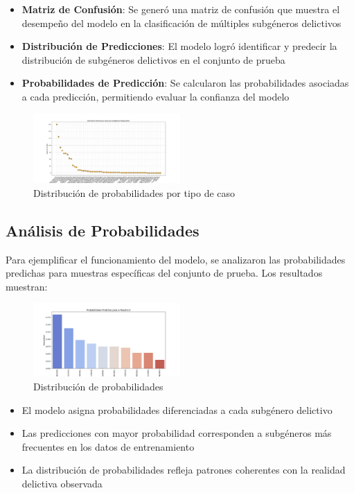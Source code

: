 \documentclass[conference]{IEEEtran}
\begin{document}
\begin{itemize}
\item \textbf{Matriz de Confusión}: Se generó una matriz de confusión que muestra el desempeño del modelo en la clasificación de múltiples subgéneros delictivos
\item \textbf{Distribución de Predicciones}: El modelo logró identificar y predecir la distribución de subgéneros delictivos en el conjunto de prueba
\item \textbf{Probabilidades de Predicción}: Se calcularon las probabilidades asociadas a cada predicción, permitiendo evaluar la confianza del modelo
\end{itemize}
\begin{figure}[htbp]
\centerline{\includegraphics[width=0.5\textwidth]{N_predicho.png}}
\caption{Distribución de probabilidades por tipo de caso}
\label{fig:distribucion}
\end{figure}

\subsection{Análisis de Probabilidades}

Para ejemplificar el funcionamiento del modelo, se analizaron las probabilidades predichas para muestras específicas del conjunto de prueba. Los resultados muestran:
\begin{figure}[htbp]
\centerline{\includegraphics[width=0.5\textwidth]{prob_pedict.png}}
\caption{Distribución de probabilidades}
\label{fig:distribucion}
\end{figure}

\begin{itemize}
\item El modelo asigna probabilidades diferenciadas a cada subgénero delictivo
\item Las predicciones con mayor probabilidad corresponden a subgéneros más frecuentes en los datos de entrenamiento
\item La distribución de probabilidades refleja patrones coherentes con la realidad delictiva observada
\end{itemize}
\end{document}
